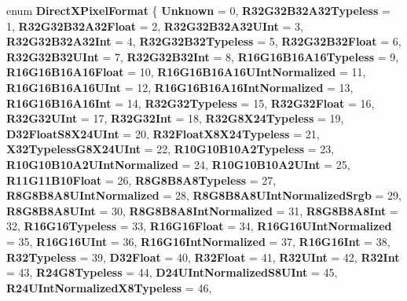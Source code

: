 \begin{DoxyCompactItemize}
enum {\bfseries Direct\+X\+Pixel\+Format} \{ \newline
{\bfseries Unknown} = 0, 
{\bfseries R32\+G32\+B32\+A32\+Typeless} = 1, 
{\bfseries R32\+G32\+B32\+A32\+Float} = 2, 
{\bfseries R32\+G32\+B32\+A32\+U\+Int} = 3, 
\newline
{\bfseries R32\+G32\+B32\+A32\+Int} = 4, 
{\bfseries R32\+G32\+B32\+Typeless} = 5, 
{\bfseries R32\+G32\+B32\+Float} = 6, 
{\bfseries R32\+G32\+B32\+U\+Int} = 7, 
\newline
{\bfseries R32\+G32\+B32\+Int} = 8, 
{\bfseries R16\+G16\+B16\+A16\+Typeless} = 9, 
{\bfseries R16\+G16\+B16\+A16\+Float} = 10, 
{\bfseries R16\+G16\+B16\+A16\+U\+Int\+Normalized} = 11, 
\newline
{\bfseries R16\+G16\+B16\+A16\+U\+Int} = 12, 
{\bfseries R16\+G16\+B16\+A16\+Int\+Normalized} = 13, 
{\bfseries R16\+G16\+B16\+A16\+Int} = 14, 
{\bfseries R32\+G32\+Typeless} = 15, 
\newline
{\bfseries R32\+G32\+Float} = 16, 
{\bfseries R32\+G32\+U\+Int} = 17, 
{\bfseries R32\+G32\+Int} = 18, 
{\bfseries R32\+G8\+X24\+Typeless} = 19, 
\newline
{\bfseries D32\+Float\+S8\+X24\+U\+Int} = 20, 
{\bfseries R32\+Float\+X8\+X24\+Typeless} = 21, 
{\bfseries X32\+Typeless\+G8\+X24\+U\+Int} = 22, 
{\bfseries R10\+G10\+B10\+A2\+Typeless} = 23, 
\newline
{\bfseries R10\+G10\+B10\+A2\+U\+Int\+Normalized} = 24, 
{\bfseries R10\+G10\+B10\+A2\+U\+Int} = 25, 
{\bfseries R11\+G11\+B10\+Float} = 26, 
{\bfseries R8\+G8\+B8\+A8\+Typeless} = 27, 
\newline
{\bfseries R8\+G8\+B8\+A8\+U\+Int\+Normalized} = 28, 
{\bfseries R8\+G8\+B8\+A8\+U\+Int\+Normalized\+Srgb} = 29, 
{\bfseries R8\+G8\+B8\+A8\+U\+Int} = 30, 
{\bfseries R8\+G8\+B8\+A8\+Int\+Normalized} = 31, 
\newline
{\bfseries R8\+G8\+B8\+A8\+Int} = 32, 
{\bfseries R16\+G16\+Typeless} = 33, 
{\bfseries R16\+G16\+Float} = 34, 
{\bfseries R16\+G16\+U\+Int\+Normalized} = 35, 
\newline
{\bfseries R16\+G16\+U\+Int} = 36, 
{\bfseries R16\+G16\+Int\+Normalized} = 37, 
{\bfseries R16\+G16\+Int} = 38, 
{\bfseries R32\+Typeless} = 39, 
\newline
{\bfseries D32\+Float} = 40, 
{\bfseries R32\+Float} = 41, 
{\bfseries R32\+U\+Int} = 42, 
{\bfseries R32\+Int} = 43, 
\newline
{\bfseries R24\+G8\+Typeless} = 44, 
{\bfseries D24\+U\+Int\+Normalized\+S8\+U\+Int} = 45, 
{\bfseries R24\+U\+Int\+Normalized\+X8\+Typeless} = 46, 

\end{DoxyCompactItemize}
